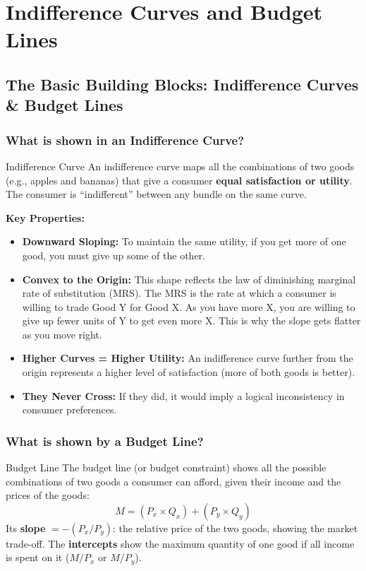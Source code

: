\documentclass[11pt, a4paper, twoside]{book}
\begin{document}
\section{Indifference Curves and Budget Lines}

\subsection{The Basic Building Blocks: Indifference Curves \& Budget Lines}

\subsubsection{What is shown in an Indifference Curve?}

\begin{keyterm}{Indifference Curve}
An indifference curve maps all the combinations of two goods (e.g., apples and bananas) that give a consumer \textbf{equal satisfaction or utility}. The consumer is ``indifferent'' between any bundle on the same curve.
\end{keyterm}

\textbf{Key Properties:}
\begin{itemize}
  \item \textbf{Downward Sloping:} To maintain the same utility, if you get more of one good, you must give up some of the other.
  \item \textbf{Convex to the Origin:} This shape reflects the law of diminishing marginal rate of substitution (MRS). The MRS is the rate at which a consumer is willing to trade Good Y for Good X. As you have more X, you are willing to give up fewer units of Y to get even more X. This is why the slope gets flatter as you move right.
  \item \textbf{Higher Curves = Higher Utility:} An indifference curve further from the origin represents a higher level of satisfaction (more of both goods is better).
  \item \textbf{They Never Cross:} If they did, it would imply a logical inconsistency in consumer preferences.
\end{itemize}

\subsubsection{What is shown by a Budget Line?}

\begin{keyterm}{Budget Line}
The budget line (or budget constraint) shows all the possible combinations of two goods a consumer can afford, given their income and the prices of the goods:
\[ M = (P_x \times Q_x) + (P_y \times Q_y) \]
Its \textbf{slope} $= -(P_x / P_y)$: the relative price of the two goods, showing the market trade-off. The \textbf{intercepts} show the maximum quantity of one good if all income is spent on it ($M/P_x$ or $M/P_y$).
\end{keyterm}
\end{document}
